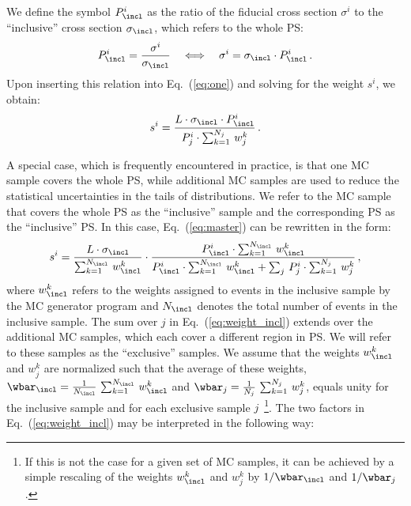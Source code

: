 We define the symbol $P_{\incl}^{i}$ as the ratio of the fiducial cross section $\sigma^{i}$ to the ``inclusive'' cross section $\sigma_{\incl}$,
which refers to the whole PS:
\begin{equation*}
P_{\incl}^{i} = \frac{\sigma^{i}}{\sigma_{\incl}} \quad \Longleftrightarrow \quad \sigma^{i} = \sigma_{\incl} \cdot P_{\incl}^{i} \, .
\label{eq:two}
\end{equation*}
Upon inserting this relation into Eq.~(\ref{eq:one}) and solving for the weight $s^{i}$, we obtain:
\begin{equation}
s^{i} = \frac{L \cdot \sigma_{\incl} \cdot P_{\incl}^{i}}{P_{j}^{i} \cdot \sum_{k=1}^{N_{j}} \, w_{j}^{k}} \, .
\label{eq:master}
\end{equation}

A special case, which is frequently encountered in practice,
is that one MC sample covers the whole PS,
while additional MC samples are used to reduce the statistical uncertainties in the tails of distributions.
We refer to the MC sample that covers the whole PS as the ``inclusive'' sample and the corresponding PS as the ``inclusive'' PS.
In this case, Eq.~(\ref{eq:master}) can be rewritten in the form:
\begin{equation}
s^{i} = \frac{L \cdot \sigma_{\incl}}{\sum_{k=1}^{N_{\incl}} \, w_{\incl}^{k}} \cdot \frac{P_{\incl}^{i} \cdot \sum_{k=1}^{N_{\incl}} \, w_{\incl}^{k}}{P_{\incl}^{i} \cdot \sum_{k=1}^{N_{\incl}} \, w_{\incl}^{k} + \sum_{j} \, P_{j}^{i} \cdot \sum_{k=1}^{N_{j}} \, w_{j}^{k}} \, ,
\label{eq:weight_incl}
\end{equation}
where $w_{\incl}^{k}$ refers to the weights assigned to events in the inclusive sample by the MC generator program and $N_{\incl}$ denotes the total number of events in the inclusive sample.
The sum over $j$ in Eq.~(\ref{eq:weight_incl}) extends over the additional MC samples, which each cover a different region in PS.
We will refer to these samples as the ``exclusive'' samples.
We assume that the weights $w_{\incl}^{k}$ and $w_{j}^{k}$ are normalized such that the average of these weights,
$\wbar_{\incl} = \frac{1}{N_{\incl}} \, \sum_{k=1}^{N_{\incl}} \, w_{\incl}^{k}$ and $\wbar_{j} = \frac{1}{N_{j}} \, \sum_{k=1}^{N_{j}} \, w_{j}^{k}$,
equals unity for the inclusive sample and for each exclusive sample $j$~\footnote{
  If this is not the case for a given set of MC samples,
  it can be achieved by a simple rescaling of the weights $w_{\incl}^{k}$ and $w_{j}^{k}$ by $1/\wbar_{\incl}$ and $1/\wbar_{j}$.
}.
The two factors in Eq.~(\ref{eq:weight_incl}) may be interpreted in the following way:
